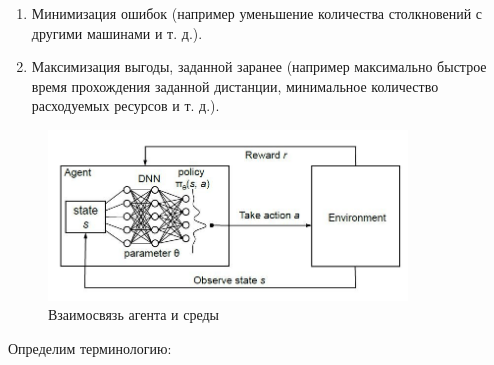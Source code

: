 \documentclass[bachelor, och, coursework]{shiza}
\begin{document}
\begin{enumerate}
    \item Минимизация ошибок (например уменьшение количества столкновений с другими машинами и т. д.).
    \item Максимизация выгоды, заданной заранее (например максимально быстрое время прохождения заданной дистанции, минимальное количество расходуемых ресурсов и т. д.).
\end{enumerate}

\begin{figure}[H]
    \centering
    \includegraphics[width=0.85\textwidth]{pic/7}
    \caption{Взаимосвязь агента и среды}
    \label{fig:img1}
\end{figure}

Определим терминологию:
\end{document}
